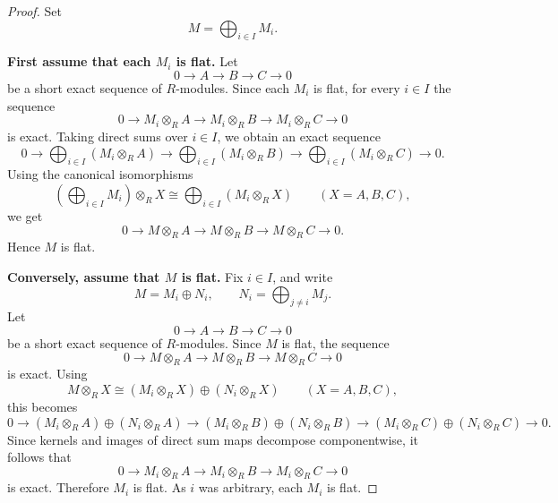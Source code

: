 \begin{proof}
    Set
    \[
        M=\bigoplus_{i\in I} M_i.
    \]

    \medskip
    \noindent\textbf{First assume that each $M_i$ is flat.}
    Let
    \[
        0\longrightarrow A \longrightarrow B \longrightarrow C \longrightarrow 0
    \]
    be a short exact sequence of $R$-modules.
    Since each $M_i$ is flat, for every $i\in I$ the sequence
    \[
        0\longrightarrow M_i\otimes_R A
        \longrightarrow M_i\otimes_R B
        \longrightarrow M_i\otimes_R C
        \longrightarrow 0
    \]
    is exact.
    Taking direct sums over $i\in I$, we obtain an exact sequence
    \[
        0\longrightarrow \bigoplus_{i\in I}(M_i\otimes_R A)
        \longrightarrow \bigoplus_{i\in I}(M_i\otimes_R B)
        \longrightarrow \bigoplus_{i\in I}(M_i\otimes_R C)
        \longrightarrow 0.
    \]
    Using the canonical isomorphisms
    \[
        \left(\bigoplus_{i\in I} M_i\right)\otimes_R X
        \cong
        \bigoplus_{i\in I}(M_i\otimes_R X)
        \qquad (X=A,B,C),
    \]
    we get
    \[
        0\longrightarrow M\otimes_R A
        \longrightarrow M\otimes_R B
        \longrightarrow M\otimes_R C
        \longrightarrow 0.
    \]
    Hence $M$ is flat.

    \medskip
    \noindent\textbf{Conversely, assume that $M$ is flat.}
    Fix $i\in I$, and write
    \[
        M=M_i\oplus N_i,
        \qquad
        N_i=\bigoplus_{j\neq i} M_j.
    \]
    Let
    \[
        0\longrightarrow A \longrightarrow B \longrightarrow C \longrightarrow 0
    \]
    be a short exact sequence of $R$-modules.
    Since $M$ is flat, the sequence
    \[
        0\longrightarrow M\otimes_R A
        \longrightarrow M\otimes_R B
        \longrightarrow M\otimes_R C
        \longrightarrow 0
    \]
    is exact.
    Using
    \[
        M\otimes_R X
        \cong
        (M_i\otimes_R X)\oplus(N_i\otimes_R X)
        \qquad (X=A,B,C),
    \]
    this becomes
    \[
        0\longrightarrow
        (M_i\otimes_R A)\oplus(N_i\otimes_R A)
        \longrightarrow
        (M_i\otimes_R B)\oplus(N_i\otimes_R B)
        \longrightarrow
        (M_i\otimes_R C)\oplus(N_i\otimes_R C)
        \longrightarrow 0.
    \]
    Since kernels and images of direct sum maps decompose componentwise, it follows that
    \[
        0\longrightarrow M_i\otimes_R A
        \longrightarrow M_i\otimes_R B
        \longrightarrow M_i\otimes_R C
        \longrightarrow 0
    \]
    is exact.
    Therefore $M_i$ is flat.
    As $i$ was arbitrary, each $M_i$ is flat.
\end{proof}

